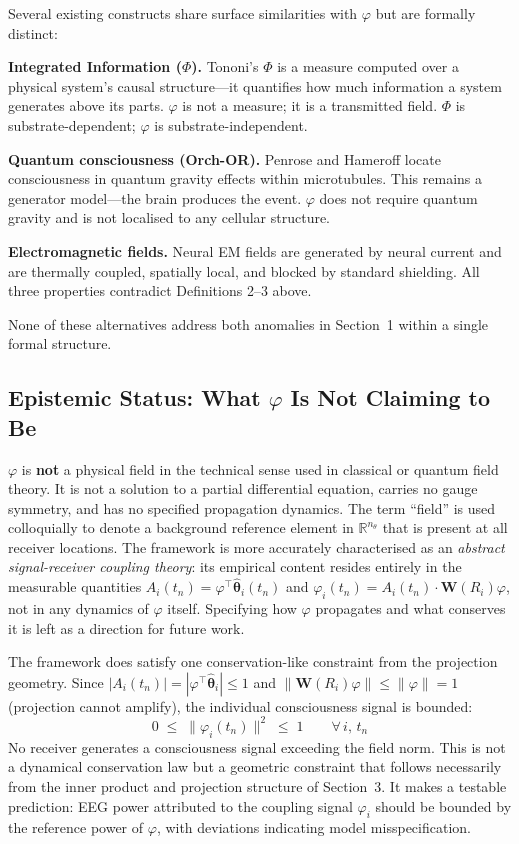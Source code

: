 \documentclass[12pt]{article}
\begin{document}
Several existing constructs share surface similarities with $\varphi$ but are formally distinct:

\textbf{Integrated Information ($\Phi$).} Tononi's $\Phi$ \cite{tononi2004} is a measure computed over a physical system's causal structure---it quantifies how much information a system generates above its parts. $\varphi$ is not a measure; it is a transmitted field. $\Phi$ is substrate-dependent; $\varphi$ is substrate-independent.

\textbf{Quantum consciousness (Orch-OR).} Penrose and Hameroff \cite{penrose1994} locate consciousness in quantum gravity effects within microtubules. This remains a generator model---the brain produces the event. $\varphi$ does not require quantum gravity and is not localised to any cellular structure.

\textbf{Electromagnetic fields.} Neural EM fields \cite{mcfadden2002} are generated by neural current and are thermally coupled, spatially local, and blocked by standard shielding. All three properties contradict Definitions 2--3 above.

None of these alternatives address both anomalies in Section~1 within a single formal structure.

\subsection{Epistemic Status: What \texorpdfstring{$\varphi$}{phi} Is Not Claiming to Be}

$\varphi$ is \textbf{not} a physical field in the technical sense used in classical or quantum field theory. It is not a solution to a partial differential equation, carries no gauge symmetry, and has no specified propagation dynamics. The term ``field'' is used colloquially to denote a background reference element in $\mathbb{R}^{n_\theta}$ that is present at all receiver locations. The framework is more accurately characterised as an \emph{abstract signal-receiver coupling theory}: its empirical content resides entirely in the measurable quantities $A_i(t_n) = \varphi^\top\hat{\boldsymbol{\theta}}_i(t_n)$ and $\varphi_i(t_n) = A_i(t_n)\cdot\mathbf{W}(R_i)\varphi$, not in any dynamics of $\varphi$ itself. Specifying how $\varphi$ propagates and what conserves it is left as a direction for future work.

The framework does satisfy one conservation-like constraint from the projection geometry. Since $|A_i(t_n)| = |\varphi^\top\hat{\boldsymbol{\theta}}_i| \leq 1$ and $\|\mathbf{W}(R_i)\varphi\| \leq \|\varphi\| = 1$ (projection cannot amplify), the individual consciousness signal is bounded:
\begin{equation}\label{eq:bound}
    0 \;\leq\; \|\varphi_i(t_n)\|^2 \;\leq\; 1 \qquad \forall\, i,\, t_n
\end{equation}
No receiver generates a consciousness signal exceeding the field norm. This is not a dynamical conservation law but a geometric constraint that follows necessarily from the inner product and projection structure of Section~3. It makes a testable prediction: EEG power attributed to the coupling signal $\varphi_i$ should be bounded by the reference power of $\varphi$, with deviations indicating model misspecification.
\end{document}
